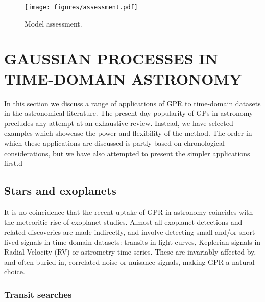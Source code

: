 \documentclass[letterpaper]{ar-1col}
\begin{document}
\begin{figure}[ht]
  \centering
  \texttt{[image: figures/assessment.pdf]}
  \caption{Model assessment.}
  \label{fig:assessment}
\end{figure}


\section{GAUSSIAN PROCESSES IN TIME-DOMAIN ASTRONOMY}
\label{sec:uses}

In this section we discuss a range of applications of GPR to time-domain datasets in the astronomical literature. The present-day popularity of GPs in astronomy precludes any attempt at an exhaustive review. Instead, we have selected examples which showcase the power and flexibility of the method. The order in which these applications are discussed is partly based on chronological considerations, but we have also attempted to present the simpler applications first.d


\subsection{Stars and exoplanets}
\label{sec:stars_planets}

It is no coincidence that the recent uptake of GPR in astronomy coincides with the meteoritic rise of exoplanet studies. Almost all exoplanet detections and related discoveries are made indirectly, and involve detecting small and/or short-lived signals in time-domain datasets: transits in light curves, Keplerian signals in Radial Velocity (RV) or astrometry time-series. These are invariably affected by, and often buried in, correlated noise or nuisance signals, making GPR a natural choice.


\subsubsection{Transit searches}
\label{sec:transit_det}
\end{document}
